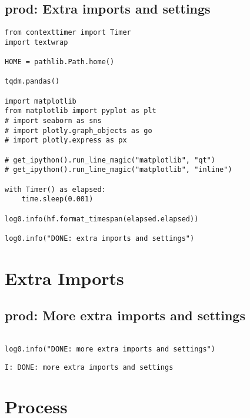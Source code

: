 \documentclass[a4paper,10pt,onecolumn,oneside,openright]{article}
\begin{document}
\subsection{prod: Extra imports and settings}
\label{sec:org61b2e72}
\begin{verbatim}
from contexttimer import Timer
import textwrap

HOME = pathlib.Path.home()

tqdm.pandas()

import matplotlib
from matplotlib import pyplot as plt
# import seaborn as sns
# import plotly.graph_objects as go
# import plotly.express as px

# get_ipython().run_line_magic("matplotlib", "qt")
# get_ipython().run_line_magic("matplotlib", "inline")

with Timer() as elapsed:
    time.sleep(0.001)

log0.info(hf.format_timespan(elapsed.elapsed))

log0.info("DONE: extra imports and settings")
\end{verbatim}

\section{Extra Imports}
\label{sec:orgdb71a95}
\subsection{prod: More extra imports and settings}
\label{sec:org94137ec}
\begin{verbatim}

log0.info("DONE: more extra imports and settings")
\end{verbatim}

\begin{verbatim}
I: DONE: more extra imports and settings
\end{verbatim}

\section{Process}
\label{sec:org5675c38}
\end{document}
